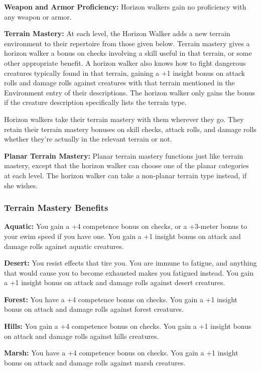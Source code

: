 {
\textbf{Weapon and Armor Proficiency:} Horizon walkers gain no proficiency with any weapon or armor.

\textbf{Terrain Mastery:} At each level, the Horizon Walker adds a new terrain environment to their repertoire from those given below. Terrain mastery gives a horizon walker a bonus on checks involving a skill useful in that terrain, or some other appropriate benefit. A horizon walker also knows how to fight dangerous creatures typically found in that terrain, gaining a +1 insight bonus on attack rolls and damage rolls against creatures with that terrain mentioned in the Environment entry of their descriptions. The horizon walker only gains the bonus if the creature description specifically lists the terrain type.

Horizon walkers take their terrain mastery with them wherever they go. They retain their terrain mastery bonuses on skill checks, attack rolls, and damage rolls whether they're actually in the relevant terrain or not.

\textbf{Planar Terrain Mastery:} Planar terrain mastery functions just like terrain mastery, except that the horizon walker can choose one of the planar categories at each level. The horizon walker can take a non-planar terrain type instead, if she wishes.

\subsubsection{Terrain Mastery Benefits}
\textbf{Aquatic:} You gain a +4 competence bonus on  checks, or a +3-meter bonus to your swim speed if you have one. You gain a +1 insight bonus on attack and damage rolls against aquatic creatures.

\textbf{Desert:} You resist effects that tire you. You are immune to fatigue, and anything that would cause you to become exhausted makes you fatigued instead. You gain a +1 insight bonus on attack and damage rolls against desert creatures.

\textbf{Forest:} You have a +4 competence bonus on  checks. You gain a +1 insight bonus on attack and damage rolls against forest creatures.

\textbf{Hills:} You gain a +4 competence bonus on  checks. You gain a +1 insight bonus on attack and damage rolls against hills creatures.

\textbf{Marsh:} You have a +4 competence bonus on  checks. You gain a +1 insight bonus on attack and damage rolls against marsh creatures.

}
